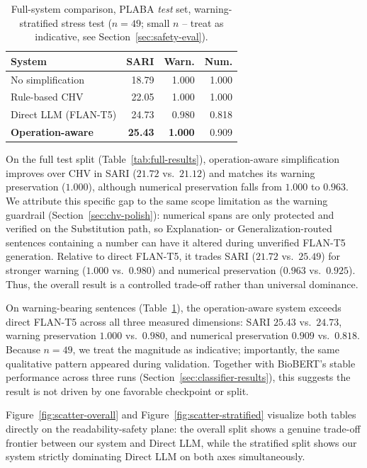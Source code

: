 \documentclass[11pt]{article}
\begin{document}
\begin{table}[t]
\centering
\small
\begin{tabular}{lrrr}
\toprule
\textbf{System} & \textbf{SARI} & \textbf{Warn.} & \textbf{Num.} \\
\midrule
No simplification    & 18.79 & 1.000 & 1.000 \\
Rule-based CHV        & 22.05 & 1.000 & 1.000 \\
Direct LLM (FLAN-T5)   & 24.73 & 0.980 & 0.818 \\
\textbf{Operation-aware} & \textbf{25.43} & \textbf{1.000} & 0.909 \\
\bottomrule
\end{tabular}
\caption{Full-system comparison, PLABA \emph{test} set, warning-stratified
stress test ($n=49$; small $n$ -- treat as indicative, see
Section~\ref{sec:safety-eval}).}
\label{tab:full-results-stratified}
\end{table}

On the full test split (Table~\ref{tab:full-results}), operation-aware
simplification improves over CHV in SARI ($21.72$ vs.\ $21.12$) and matches
its warning preservation ($1.000$), although numerical preservation falls
from $1.000$ to $0.963$. We attribute this specific gap to the same scope
limitation as the warning guardrail (Section~\ref{sec:chv-polish}):
numerical spans are only protected and verified on the Substitution path,
so Explanation- or Generalization-routed sentences containing a number can
have it altered during unverified FLAN-T5 generation. Relative to direct
FLAN-T5, it trades SARI ($21.72$ vs.\ $25.49$) for stronger warning ($1.000$
vs.\ $0.980$) and numerical preservation ($0.963$ vs.\ $0.925$). Thus, the
overall result is a controlled trade-off rather than universal dominance.

On warning-bearing sentences (Table~\ref{tab:full-results-stratified}), the
operation-aware system exceeds direct FLAN-T5 across all three measured
dimensions: SARI $25.43$ vs.\ $24.73$, warning preservation $1.000$ vs.\
$0.980$, and numerical preservation $0.909$ vs.\ $0.818$. Because $n=49$, we
treat the magnitude as indicative; importantly, the same qualitative pattern
appeared during validation. Together with BioBERT's stable performance
across three runs (Section~\ref{sec:classifier-results}), this suggests the
result is not driven by one favorable checkpoint or split.

Figure~\ref{fig:scatter-overall} and Figure~\ref{fig:scatter-stratified}
visualize both tables directly on the readability-safety plane: the overall
split shows a genuine trade-off frontier between our system and Direct LLM,
while the stratified split shows our system strictly dominating Direct LLM
on both axes simultaneously.
\end{document}
